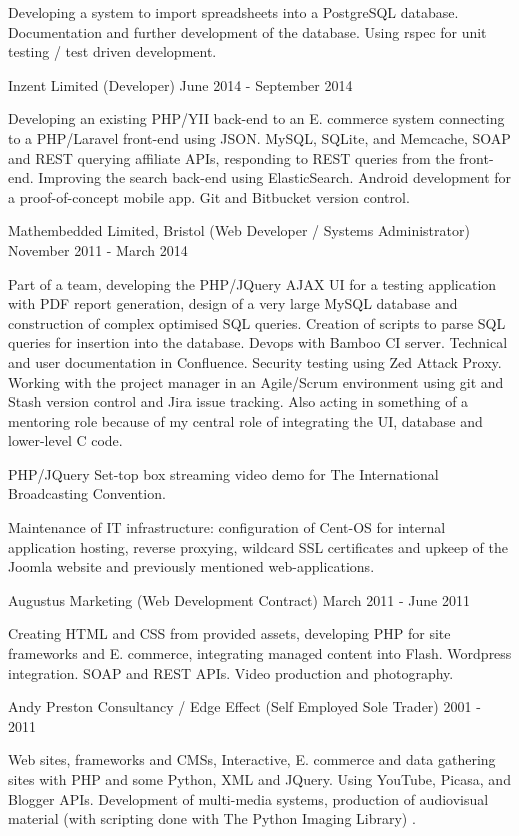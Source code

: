Developing a 
system to import spreadsheets into a PostgreSQL database.
Documentation and further development of the database.
Using rspec for unit testing / test driven development.

\jobHeading
    {Inzent Limited (Developer)}
    {June 2014 - September 2014}

Developing an existing PHP/YII back-end to an
E. commerce system connecting to a PHP/Laravel front-end using JSON.
MySQL, SQLite, and Memcache, SOAP and REST querying affiliate APIs,
responding to REST queries from the front-end.
Improving the search back-end using ElasticSearch.
Android development for a proof-of-concept mobile app.
Git and Bitbucket version control.

\jobHeading
    {Mathembedded Limited, Bristol (Web Developer / Systems Administrator)}
    {November 2011 - March 2014}

Part of a team, developing the PHP/JQuery AJAX UI
for a testing application with PDF report generation,
design of a very large MySQL database
and construction of complex optimised SQL queries.
Creation of  scripts
to parse SQL queries for insertion into the database.
Devops with Bamboo CI server.
Technical and user documentation in Confluence.
Security testing using Zed Attack Proxy.
Working with the project manager in an Agile/Scrum environment
using git and Stash version control and Jira issue tracking.
Also acting in something of a mentoring role
because of my central role of integrating the UI,
database and lower-level C code.

PHP/JQuery Set-top box streaming video demo for
The International Broadcasting Convention.

Maintenance of IT infrastructure:
configuration of Cent-OS for internal application hosting,
reverse proxying, wildcard SSL certificates
and upkeep of the Joomla website
and previously mentioned web-applications.

\jobHeading
    {Augustus Marketing (Web Development Contract)}
    {March 2011 - June 2011}

Creating HTML and CSS from provided assets,
developing PHP for site frameworks and E. commerce,
integrating managed content into Flash.
Wordpress integration.
SOAP and REST APIs.
Video production and photography.

\jobHeading
    {Andy Preston Consultancy / Edge Effect (Self Employed Sole Trader)}
    {2001 - 2011}

Web sites, frameworks and CMSs, Interactive, E. commerce and
data gathering sites with PHP and some Python, XML and JQuery.
Using YouTube, Picasa, and Blogger APIs.
Development of multi-media systems, production of audiovisual
material\ifnum{}
    { (with scripting done with The Python Imaging Library)}
\fi.

